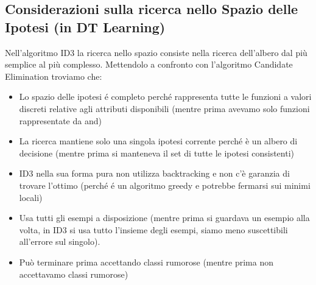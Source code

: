 \documentclass{article}
\begin{document}
\subsection{Considerazioni sulla ricerca nello Spazio delle Ipotesi (in DT Learning)}
Nell'algoritmo ID3 la ricerca nello spazio consiste nella ricerca dell'albero dal più semplice al più complesso. Mettendolo a confronto con l'algoritmo Candidate Elimination troviamo che:
\begin{itemize}
    \item Lo spazio delle ipotesi é completo perché rappresenta tutte le funzioni a valori discreti relative agli attributi disponibili (mentre prima avevamo solo funzioni rappresentate da and)
    \item La ricerca mantiene solo una singola ipotesi corrente perché è un albero di decisione (mentre prima si manteneva il set di tutte le ipotesi consistenti)
    \item ID3 nella sua forma pura non utilizza backtracking e non c'è garanzia di trovare l'ottimo (perché é un algoritmo greedy e potrebbe fermarsi sui minimi locali)
    \item Usa tutti gli esempi a disposizione (mentre prima si guardava un esempio alla volta, in ID3 si usa tutto l'insieme degli esempi, siamo meno suscettibili all'errore sul singolo).
    \item Può terminare prima accettando classi rumorose (mentre prima non accettavamo classi rumorose)
\end{itemize}
\end{document}
